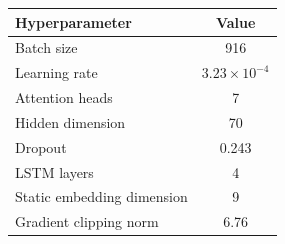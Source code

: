 \begin{tabular}{lc}
\toprule
Hyperparameter & Value \\
\midrule
Batch size & 916 \\
Learning rate & $3.23\times10^{-4}$ \\
Attention heads & 7 \\
Hidden dimension & 70 \\
Dropout & 0.243 \\
LSTM layers & 4 \\
Static embedding dimension & 9 \\
Gradient clipping norm & 6.76 \\
\bottomrule
\end{tabular}
